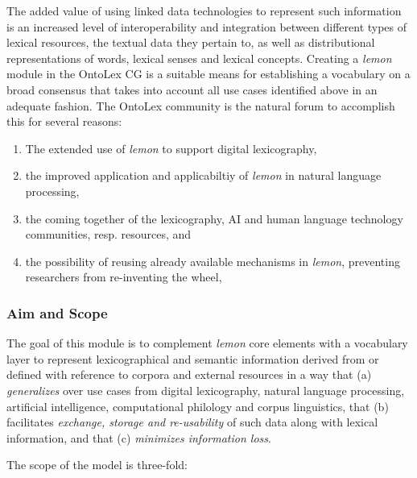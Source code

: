 \documentclass[a4paper]{article}
\newcommand\textstyleEmphasis[1]{\textit{#1}}
\newcommand\liststyleWWNumiii{%
\renewcommand\theenumi{\arabic{enumi}}
\renewcommand\theenumii{\arabic{enumii}}
\renewcommand\theenumiii{\arabic{enumiii}}
\renewcommand\theenumiv{\arabic{enumiv}}
\renewcommand\labelenumi{\theenumi.}
\renewcommand\labelenumii{\theenumii.}
\renewcommand\labelenumiii{\theenumiii.}
\renewcommand\labelenumiv{\theenumiv.}
}
\begin{document}
The added value of using linked data technologies to represent such information is an increased level of interoperability and integration between different types of lexical resources, the textual data they pertain to, as well as distributional representations of words, lexical senses and lexical concepts. Creating a \textstyleEmphasis{lemon} module in the OntoLex CG is a suitable means for establishing a vocabulary on a broad consensus that takes into account all use cases identified above in an adequate fashion.%
%
%
 The OntoLex community is the natural forum to accomplish this for several reasons: 

\liststyleWWNumiii
\begin{enumerate}
\item The extended use of \textstyleEmphasis{lemon} to support digital lexicography, 
\item the improved application and applicabiltiy of \textstyleEmphasis{lemon} in natural language processing, 
\item the coming together of the lexicography, AI and human language technology communities, resp. resources, and 
\item the possibility of reusing already available mechanisms in \textstyleEmphasis{lemon}, preventing researchers from {\textquotedbl}re-inventing the wheel{\textquotedbl}, 
\end{enumerate}
\subsubsection{Aim and Scope }
The goal of this module is to complement \textstyleEmphasis{lemon} core elements with a vocabulary layer to represent lexicographical and semantic information derived from or defined with reference to corpora and external resources in a way that (a) \textit{generalizes} over use cases from digital lexicography, natural language processing, artificial intelligence, computational philology and corpus linguistics, that (b) facilitates \textit{exchange, storage and re-usability} of such data along with lexical information, and that (c) \textit{minimizes information loss}. 

The scope of the model is three-fold: 
\end{document}
